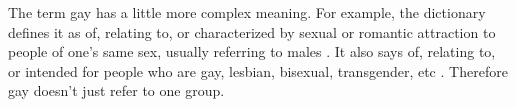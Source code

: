The term gay has a little more complex meaning. For example, the dictionary 
defines it as of, relating to, or characterized by sexual or romantic 
attraction to people of one's same sex, usually referring to males 
\cite{gay-def}. It also says of, relating to, or intended for people who are 
gay, lesbian, bisexual, transgender, etc \cite{gay-def}. Therefore gay doesn’t 
just refer to one group.
